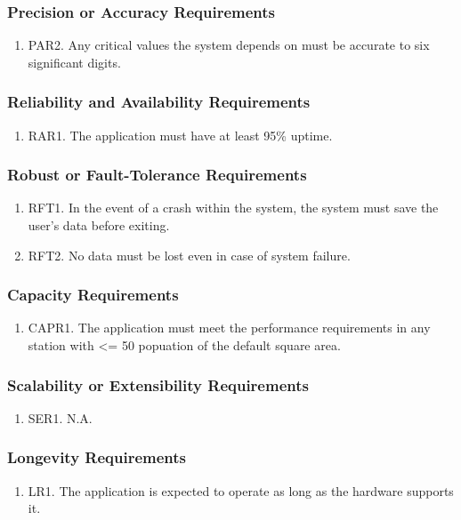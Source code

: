 \documentclass[]{article}
\begin{document}
\subsubsection{Precision or Accuracy Requirements}
\begin{enumerate}
	\item PAR2. Any critical values the system depends on must be accurate to six significant digits.
\end{enumerate}

\subsubsection{Reliability and Availability Requirements}
\begin{enumerate}
	\item RAR1. The application must have at least 95\% uptime.
\end{enumerate}

\subsubsection{Robust or Fault-Tolerance Requirements}
\begin{enumerate}
	\item RFT1. In the event of a crash within the system, the system must save the user's data before exiting.
	\item RFT2. No data must be lost even in case of system failure.
\end{enumerate}

\subsubsection{Capacity Requirements}
\begin{enumerate}
	\item CAPR1. The application must meet the performance requirements in any station with <= 50 popuation of the default square area.
\end{enumerate}

\subsubsection{Scalability or Extensibility Requirements}
\begin{enumerate}
	\item SER1. N.A.
\end{enumerate}

\subsubsection{Longevity Requirements}
\begin{enumerate}
	\item LR1. The application is expected to operate as long as the hardware supports it.
\end{enumerate}
\end{document}
